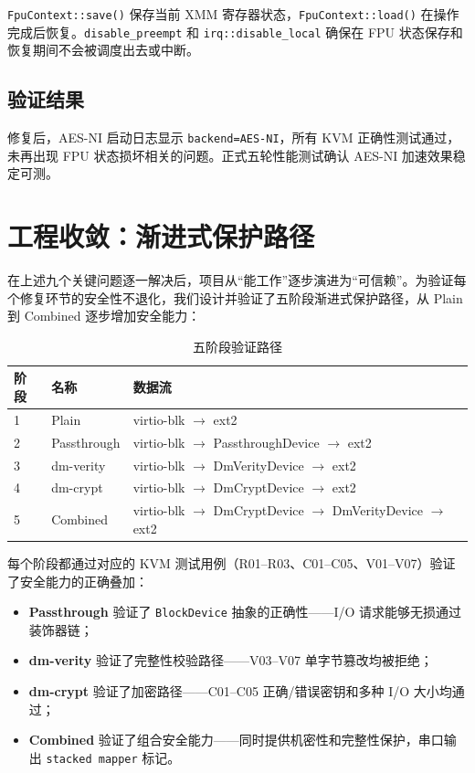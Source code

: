 \texttt{FpuContext::save()} 保存当前 XMM 寄存器状态，\texttt{FpuContext::load()} 在操作完成后恢复。\texttt{disable\_preempt} 和 \texttt{irq::disable\_local} 确保在 FPU 状态保存和恢复期间不会被调度出去或中断。

\subsection{验证结果}

修复后，AES-NI 启动日志显示 \texttt{backend=AES-NI}，所有 KVM 正确性测试通过，未再出现 FPU 状态损坏相关的问题。正式五轮性能测试确认 AES-NI 加速效果稳定可测。

\section{工程收敛：渐进式保护路径}

在上述九个关键问题逐一解决后，项目从“能工作”逐步演进为“可信赖”。为验证每个修复环节的安全性不退化，我们设计并验证了五阶段渐进式保护路径，从 Plain 到 Combined 逐步增加安全能力：

\begin{table}[H]
    \centering
    \caption{五阶段验证路径}
    \begin{tabular}{p{}p{}p{}}
        \toprule
        \textbf{阶段} & \textbf{名称} & \textbf{数据流} \\
        \midrule
        1 & Plain & virtio-blk $\to$ ext2 \\
        2 & Passthrough & virtio-blk $\to$ PassthroughDevice $\to$ ext2 \\
        3 & dm-verity & virtio-blk $\to$ DmVerityDevice $\to$ ext2 \\
        4 & dm-crypt & virtio-blk $\to$ DmCryptDevice $\to$ ext2 \\
        5 & Combined & virtio-blk $\to$ DmCryptDevice $\to$ DmVerityDevice $\to$ ext2 \\
        \bottomrule
    \end{tabular}
\end{table}

每个阶段都通过对应的 KVM 测试用例（R01--R03、C01--C05、V01--V07）验证了安全能力的正确叠加：
\begin{itemize}
    \item \textbf{Passthrough} 验证了 \texttt{BlockDevice} 抽象的正确性——I/O 请求能够无损通过装饰器链；
    \item \textbf{dm-verity} 验证了完整性校验路径——V03--V07 单字节篡改均被拒绝；
    \item \textbf{dm-crypt} 验证了加密路径——C01--C05 正确/错误密钥和多种 I/O 大小均通过；
    \item \textbf{Combined} 验证了组合安全能力——同时提供机密性和完整性保护，串口输出 \texttt{stacked mapper} 标记。
\end{itemize}

